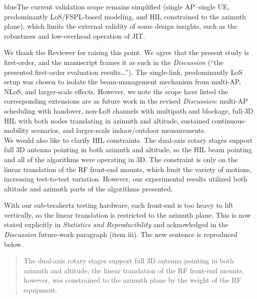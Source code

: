 \documentclass{article}
\newcommand{\blue}[1]{\begin{color}{blue}#1\end{color}}
\begin{document}
\begin{tcbremark}
{\selectfont
\blue{The current validation scope remains simplified (single AP--single UE, predominantly LoS/FSPL-based modeling, and HIL constrained to the azimuth plane), which limits the external validity of some design insights, such as the robustness and low-overhead operation of JIT.}
}
\end{tcbremark}

\noindent We thank the Reviewer for raising this point. We agree that the present study is first-order, and the manuscript frames it as such in the \emph{Discussion} (``the presented first-order evaluation results\dots''). The single-link, predominantly LoS setup was chosen to isolate the beam-management mechanism from multi-AP, NLoS, and larger-scale effects. However, we note the scope have listed the corresponding extensions are as future work in the revised \emph{Discussion}: multi-AP scheduling with handover, non-LoS channels with multipath and blockage, full-3D HIL with both nodes translating in azimuth and altitude, sustained continuous-mobility scenarios, and larger-scale indoor/outdoor measurements.\\

\noindent We would also like to clarify HIL constraints. The dual-axis rotary stages support full 3D antenna pointing in both azimuth and altitude, so the HIL beam pointing and all of the algorithms were operating in 3D. The constraint is only on the linear translation of the RF front-end mounts, which limit the variety of motions, increasing test-to-test variation. However, our experimental results utilized both altitude and azimuth parts of the algorithms presented. 

With our sub-terahertz testing hardware, each front-end is too heavy to lift vertically, so the linear translation is restricted to the azimuth plane. This is now stated explicitly in \emph{Statistics and Reproducibility} and acknowledged in the \emph{Discussion} future-work paragraph (item iii). The new sentence is reproduced below.

\begin{quote}
{\color{cyan!75!black}
The dual-axis rotary stages support full 3D antenna pointing in both azimuth and altitude; the linear translation of the RF front-end mounts, however, was constrained to the azimuth plane by the weight of the RF equipment.
}
\end{quote}
\end{document}
